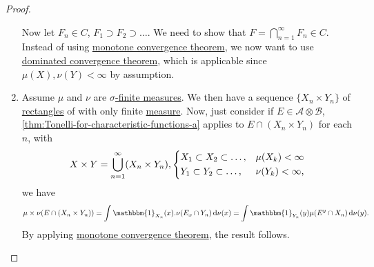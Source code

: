 \begin{proof}
\begin{enumerate}
		      Now let \(F_{n} \in C\), \(F_1\supset F_2\supset \dots  \). We need to show that \(F = \bigcap_{n=1}^{\infty} F_{n} \in C\). Instead of using \hyperref[thm:DCT]{monotone convergence theorem}, we now want to use \hyperref[thm:DCT]{dominated convergence theorem}, which is applicable since \(\mu (X), \nu (Y)< \infty \) by assumption.
		\item Assume \(\mu\) and \(\nu \) are \hyperref[def:sigma-finite-measure]{\(\sigma \)-finite measures}. We then have a sequence \(\{X_n \times Y_n\}\) of \hyperref[def:rectangle]{rectangles} of with only finite \hyperref[def:measure]{measure}. Now, just consider if \(E\in \mathcal{A} \otimes \mathcal{B} \), \autoref{thm:Tonelli-for-characteristic-functions-a} applies to \(E \cap (X_{n} \times Y_{n} )\) for each \(n\), with
		      \[
			      X\times Y = \bigcup_{n=1}^{\infty} (X_{n} \times Y_{n} ), \begin{dcases}
				      X_1\subset X_2\subset \dots , & \mu (X_{k} )< \infty   \\
				      Y_1\subset Y_2\subset \dots , & \nu (Y_{k} )< \infty ,
			      \end{dcases}
		      \]
		      we have
		      \[
			      \mu \times \nu (E \cap (X_{n} \times Y_{n} )) = \int \mathbbm{1}_{X_{n} } (x) . \nu (E_{x} \cap Y_{n} )\,\mathrm{d} \nu (x) = \int \mathbbm{1}_{Y_{n} } (y)\mu (E^y \cap X_{n} )\,\mathrm{d} \nu (y).
		      \]
		      By applying \hyperref[thm:DCT]{monotone convergence theorem}, the result follows.
	\end{enumerate}
\end{proof}

